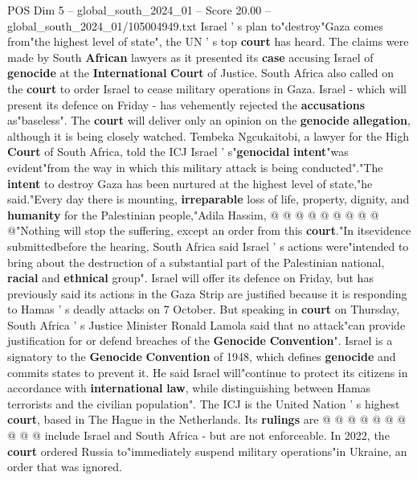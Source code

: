 \begin{textsample}{POS Dim 5 – global\_south\_2024\_01 – Score 20.00 – global\_south\_2024\_01/105004949.txt}  \label{ex:f5_pos_015}
Israel ' s plan to"destroy"Gaza comes from"the highest level of state", the UN ' s top \textbf{court} has heard.
The claims were made by South \textbf{African} lawyers as it presented its \textbf{case} accusing Israel of \textbf{genocide} at the \textbf{International} \textbf{Court} of Justice.
South Africa also called on the \textbf{court} to order Israel to cease military operations in Gaza.
Israel - which will present its defence on Friday - has vehemently rejected the \textbf{accusations} as"baseless".
The \textbf{court} will deliver only an opinion on the \textbf{genocide} \textbf{allegation}, although it is being closely watched.
Tembeka Ngcukaitobi, a lawyer for the High \textbf{Court} of South Africa, told the ICJ Israel ' s"\textbf{genocidal} \textbf{intent}"was evident"from the way in which this military attack is being conducted"."The \textbf{intent} to destroy Gaza has been nurtured at the highest level of state,"he said."Every day there is mounting, \textbf{irreparable} loss of life, property, dignity, and \textbf{humanity} for the Palestinian people,"Adila Hassim, @ @ @ @ @ @ @ @ @ @"Nothing will stop the suffering, except an order from this \textbf{court}."In itsevidence submittedbefore the hearing, South Africa said Israel ' s actions were"intended to bring about the destruction of a substantial part of the Palestinian national, \textbf{racial} and \textbf{ethnical} group".
Israel will offer its defence on Friday, but has previously said its actions in the Gaza Strip are justified because it is responding to Hamas ' s deadly attacks on 7 October.
But speaking in \textbf{court} on Thursday, South Africa ' s Justice Minister Ronald Lamola said that no attack"can provide justification for or defend breaches of the \textbf{Genocide} \textbf{Convention}".
Israel is a signatory to the \textbf{Genocide} \textbf{Convention} of 1948, which defines \textbf{genocide} and commits states to prevent it.
He said Israel will"continue to protect its citizens in accordance with \textbf{international} \textbf{law}, while distinguishing between Hamas terrorists and the civilian population".
The ICJ is the United Nation ' s highest \textbf{court}, based in The Hague in the Netherlands.
Its \textbf{rulings} are @ @ @ @ @ @ @ @ @ @ include Israel and South Africa - but are not enforceable.
In 2022, the \textbf{court} ordered Russia to"immediately suspend military operations"in Ukraine, an order that was ignored.

\end{textsample}

